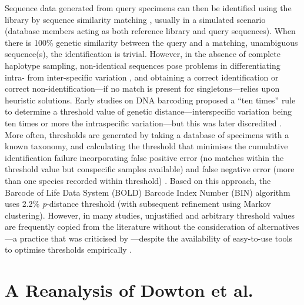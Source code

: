 \documentclass[12pt]{article}
\begin{document}
Sequence data generated from query specimens can then be identified using the library by sequence similarity matching \citep{Meier2006}, usually in a simulated scenario (database members acting as both reference library and query sequences). When there is 100\% genetic similarity between the query and a matching, unambiguous sequence(s), the identification is trivial. However, in the absence of complete haplotype sampling, non-identical sequences pose problems in differentiating intra- from inter-specific variation \citep{Virgilio2012}, and obtaining a correct identification or correct non-identification---if no match is present for singletons---relies upon heuristic solutions. Early studies on DNA barcoding \citep[e.g.][]{Hebert2004} proposed a ``ten times'' rule to determine a threshold value of genetic distance---interspecific variation being ten times or more the intraspecific variation---but this was later discredited \citep{Hickerson2006}. More often, thresholds are generated by taking a database of specimens with a known taxonomy, and calculating the threshold that minimises the cumulative identification failure incorporating false positive error (no matches within the threshold value but conspecific samples available) and false negative error (more than one species recorded within threshold) \citep{Meyer2005}. Based on this approach, the Barcode of Life Data System (BOLD) Barcode Index Number (BIN) algorithm \citep{Ratnasingham2013} uses 2.2\% \emph{p}-distance threshold (with subsequent refinement using Markov clustering). However, in many studies, unjustified and arbitrary threshold values are frequently copied from the literature without the consideration of alternatives---a practice that was criticised by \citet{Collins2013}---despite the availability of easy-to-use tools to optimise thresholds empirically \citep{Brown2012,Puillandre2012b,Virgilio2012,Sonet2013}.


\section*{A Reanalysis of Dowton et al.}
\end{document}
